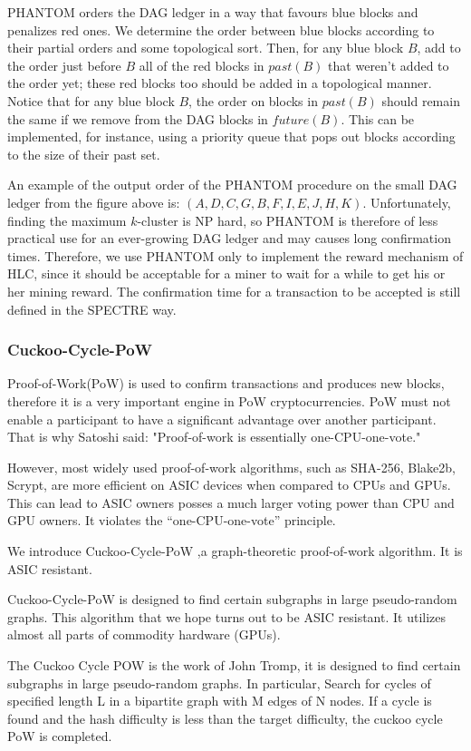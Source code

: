 \documentclass[a4paper,11pt]{article}
\begin{document}
PHANTOM orders the DAG ledger in a way that favours blue blocks and penalizes
red ones. We determine the order between blue blocks according to their partial
orders and some topological sort. Then, for any blue block $B$, add to the order
just before $B$ all of the red blocks in $past(B)$ that weren’t added to the
order yet; these red blocks too should be added in a topological manner. Notice
that for any blue block $B$, the order on blocks in $past(B)$ should remain the
same if we remove from the DAG blocks in $future(B)$. This can be implemented,
for instance, using a priority queue that pops out blocks according to the size
of their past set.

An example of the output order of the PHANTOM procedure on the small DAG ledger
from the figure above is: $(A,D,C,G,B,F,I,E,J,H,K)$. Unfortunately, finding the
maximum $k$-cluster is NP hard, so PHANTOM is therefore of less practical use
for an ever-growing DAG ledger and may causes long confirmation times.
Therefore, we use PHANTOM only to implement the reward mechanism of HLC, since
it should be acceptable for a miner to wait for a while to get his or her mining
reward. The confirmation time for a transaction to be accepted is still defined
in the SPECTRE way.

\subsubsection{Cuckoo-Cycle-PoW}

Proof-of-Work(PoW) is used to confirm transactions and produces new blocks, therefore it is a very important engine in PoW cryptocurrencies. PoW must not enable a participant to have a significant advantage over another participant. That is why Satoshi said: "Proof-of-work is essentially one-CPU-one-vote."

However, most widely used proof-of-work algorithms, such as SHA-256, Blake2b, Scrypt, are more efficient on ASIC devices when compared to CPUs and GPUs. This can lead to ASIC owners posses a much larger voting power than CPU and GPU owners. It violates the “one-CPU-one-vote” principle.

We introduce Cuckoo-Cycle-PoW ,a graph-theoretic proof-of-work algorithm. It is ASIC resistant.

Cuckoo-Cycle-PoW is designed to find certain subgraphs in large pseudo-random graphs. This algorithm that we hope turns out to be ASIC resistant. It utilizes almost all parts of commodity hardware (GPUs).

The Cuckoo Cycle POW is the work of John Tromp, it is designed to find certain subgraphs in large pseudo-random graphs. In particular, Search for cycles of specified length L in a bipartite graph with M edges of N nodes. If a cycle is found and the hash difficulty is less than the target difficulty, the cuckoo cycle PoW is completed.
\end{document}
